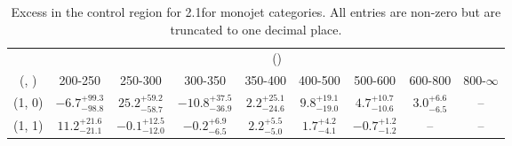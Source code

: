 \begin{table}[h!]
\tiny
\centering
\caption{Excess in the \mj control region for 2.1\ifb for monojet categories. All entries are non-zero but are truncated to one decimal place.\label{tab:excesssepnaive_mu_ewk_mono}}
\begin{tabular}
{ccccccccc}
	\hline\hline
	& \multicolumn{8}{c}{\scalht (\gev)} \\ 
	 (\njet,  \nb) & 200-250 & 250-300 & 300-350 & 350-400 & 400-500 & 500-600 & 600-800 & 800-$\infty$ \\ [0.8ex] 
\hline
	(1, 0) & $-6.7^{+ 99.3 }_{- 98.8 }$ & $25.2^{+ 59.2 }_{- 58.7 }$ & $-10.8^{+ 37.5 }_{- 36.9 }$ & $2.2^{+ 25.1 }_{- 24.6 }$ & $9.8^{+ 19.1 }_{- 19.0 }$ & $4.7^{+ 10.7 }_{- 10.6 }$ & $3.0^{+ 6.6 }_{- 6.5 }$ & -- \\[0.5ex] 
	(1, 1) & $11.2^{+ 21.6 }_{- 21.1 }$ & $-0.1^{+ 12.5 }_{- 12.0 }$ & $-0.2^{+ 6.9 }_{- 6.5 }$ & $2.2^{+ 5.5 }_{- 5.0 }$ & $1.7^{+ 4.2 }_{- 4.1 }$ & $-0.7^{+ 1.2 }_{- 1.2 }$ & -- & -- \\[0.5ex] 
	\hline
	\hline
\end{tabular}
\end{table}
